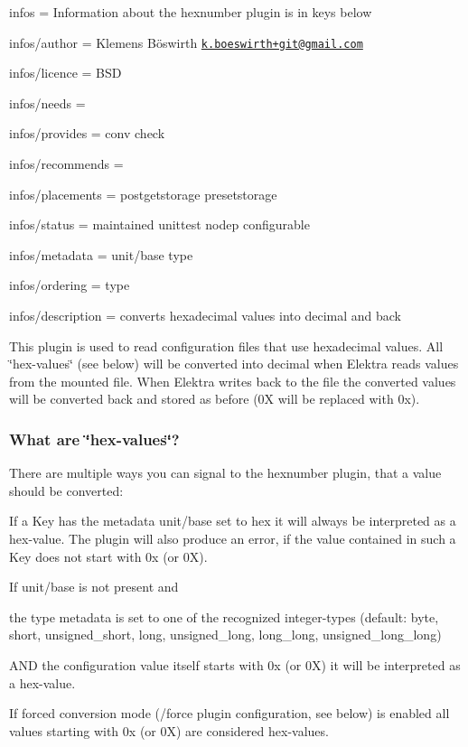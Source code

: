 
\begin{DoxyItemize}
\item infos = Information about the hexnumber plugin is in keys below
\item infos/author = Klemens Böswirth \href{mailto:k.boeswirth+git@gmail.com}{\tt k.\+boeswirth+git@gmail.\+com}
\item infos/licence = B\+SD
\item infos/needs =
\item infos/provides = conv check
\item infos/recommends =
\item infos/placements = postgetstorage presetstorage
\item infos/status = maintained unittest nodep configurable
\item infos/metadata = unit/base type
\item infos/ordering = type
\item infos/description = converts hexadecimal values into decimal and back
\end{DoxyItemize}

This plugin is used to read configuration files that use hexadecimal values. All \char`\"{}hex-\/values\char`\"{} (see below) will be converted into decimal when Elektra reads values from the mounted file. When Elektra writes back to the file the converted values will be converted back and stored as before ({\ttfamily 0X} will be replaced with {\ttfamily 0x}).

\subsubsection*{What are \char`\"{}hex-\/values\char`\"{}?}

There are multiple ways you can signal to the hexnumber plugin, that a value should be converted\+:


\begin{DoxyEnumerate}
\item If a Key has the metadata {\ttfamily unit/base} set to {\ttfamily hex} it will always be interpreted as a hex-\/value. The plugin will also produce an error, if the value contained in such a Key does not start with {\ttfamily 0x} (or {\ttfamily 0X}).
\item If {\ttfamily unit/base} is not present and
\begin{DoxyItemize}
\item the {\ttfamily type} metadata is set to one of the recognized integer-\/types (default\+: {\ttfamily byte}, {\ttfamily short}, {\ttfamily unsigned\+\_\+short}, {\ttfamily long}, {\ttfamily unsigned\+\_\+long}, {\ttfamily long\+\_\+long}, {\ttfamily unsigned\+\_\+long\+\_\+long})
\item A\+ND the configuration value itself starts with {\ttfamily 0x} (or {\ttfamily 0X}) it will be interpreted as a hex-\/value.
\end{DoxyItemize}
\item If forced conversion mode ({\ttfamily /force} plugin configuration, see below) is enabled all values starting with {\ttfamily 0x} (or {\ttfamily 0X}) are considered hex-\/values.
\end{DoxyEnumerate}

